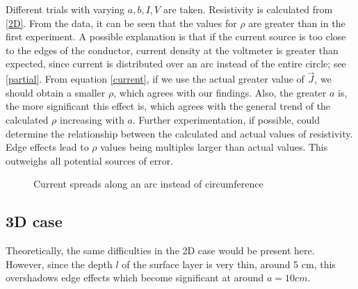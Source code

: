 \documentclass[12pt]{IEEEtran}
\begin{document}
Different trials with varying $a,b,I,V$ are taken. Resistivity is calculated from \ref{2D}. From the data, it can be seen that the values for $\rho$ are greater than in the first experiment. A possible explanation is that if the current source is too close to the edges of the conductor, current density at the voltmeter is greater than expected, since current is distributed over an arc instead of the entire circle; see \ref{partial}. From equation \ref{current}, if we use the actual greater value of $\vec J$, we should obtain a smaller $\rho$, which agrees with our findings. Also, the greater $a$ is, the more significant this effect is, which agrees with the general trend of the calculated $\rho$ increasing with $a$. Further experimentation, if possible, could determine the relationship between the calculated and actual values of resistivity. \\
Edge effects lead to $\rho$ values being multiples larger than actual values. This outweighs all potential sources of error.

\begin{figure}[h]
\begin{center}
\end{center}
\caption{Current spreads along an arc instead of circumference}
\end{figure}

\subsection{3D case}

Theoretically, the same difficulties in the 2D case would be present here. However, since the depth $l$ of the surface layer is very thin, around 5 cm, this overshadows edge effects which become significant at around $a = 10\unit{cm}$.
\end{document}

